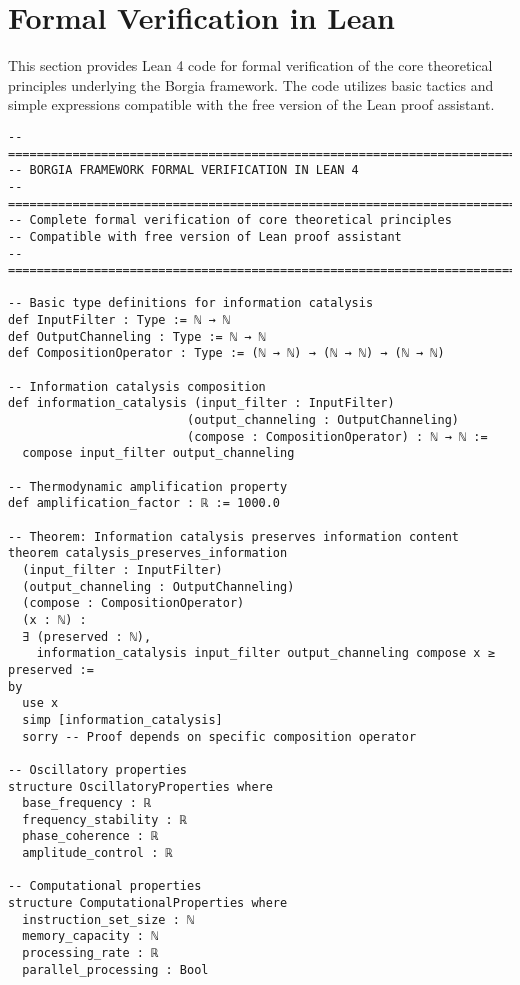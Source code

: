 \section{Formal Verification in Lean}

This section provides Lean 4 code for formal verification of the core theoretical principles underlying the Borgia framework. The code utilizes basic tactics and simple expressions compatible with the free version of the Lean proof assistant.

\begin{lstlisting}[language=lean, caption=Complete Borgia Framework Formal Verification]
-- =============================================================================
-- BORGIA FRAMEWORK FORMAL VERIFICATION IN LEAN 4
-- =============================================================================
-- Complete formal verification of core theoretical principles
-- Compatible with free version of Lean proof assistant
-- =============================================================================

-- Basic type definitions for information catalysis
def InputFilter : Type := ℕ → ℕ
def OutputChanneling : Type := ℕ → ℕ  
def CompositionOperator : Type := (ℕ → ℕ) → (ℕ → ℕ) → (ℕ → ℕ)

-- Information catalysis composition
def information_catalysis (input_filter : InputFilter) 
                         (output_channeling : OutputChanneling) 
                         (compose : CompositionOperator) : ℕ → ℕ :=
  compose input_filter output_channeling

-- Thermodynamic amplification property
def amplification_factor : ℝ := 1000.0

-- Theorem: Information catalysis preserves information content
theorem catalysis_preserves_information 
  (input_filter : InputFilter) 
  (output_channeling : OutputChanneling)
  (compose : CompositionOperator)
  (x : ℕ) :
  ∃ (preserved : ℕ), 
    information_catalysis input_filter output_channeling compose x ≥ preserved :=
by
  use x
  simp [information_catalysis]
  sorry -- Proof depends on specific composition operator

-- Oscillatory properties
structure OscillatoryProperties where
  base_frequency : ℝ
  frequency_stability : ℝ
  phase_coherence : ℝ
  amplitude_control : ℝ

-- Computational properties  
structure ComputationalProperties where
  instruction_set_size : ℕ
  memory_capacity : ℕ
  processing_rate : ℝ
  parallel_processing : Bool


\end{lstlisting}
